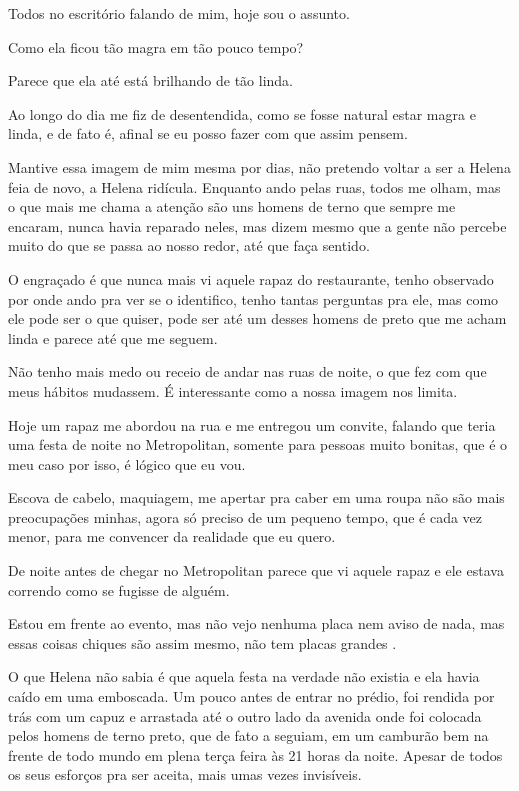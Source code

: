 Todos no escritório falando de mim, hoje sou o assunto.

Como ela ficou tão magra em tão pouco tempo?

Parece que ela até está brilhando de tão linda.

Ao longo do dia me fiz de desentendida, como se fosse natural estar magra e linda, e de fato é, afinal se eu posso fazer com que assim pensem.

Mantive essa imagem de mim mesma por dias, não pretendo voltar a ser  a Helena feia de novo, a Helena ridícula. Enquanto ando pelas ruas, todos me olham, mas o que mais me chama a atenção são uns homens de terno que sempre me encaram, nunca havia reparado neles, mas dizem mesmo que a gente não percebe muito do que se passa ao nosso redor, até que faça sentido.

O engraçado é que nunca mais vi aquele rapaz do restaurante, tenho observado por onde ando pra ver se o identifico, tenho tantas perguntas pra ele, mas como ele pode ser o que quiser, pode ser até um desses homens de preto que me acham linda e parece até que me seguem.

Não tenho mais medo ou receio de andar nas ruas de noite, o que fez com que meus hábitos mudassem. É interessante como a nossa imagem nos limita.

Hoje um rapaz me abordou na rua e me entregou um convite, falando que teria uma festa de noite no Metropolitan, somente para pessoas muito bonitas, que é o meu caso por isso, é lógico que eu vou.

Escova de cabelo, maquiagem, me apertar pra caber em uma roupa não são mais preocupações minhas, agora só preciso de um pequeno tempo, que é cada vez menor, para me convencer da realidade que eu quero.

De noite antes de chegar no Metropolitan parece que vi aquele rapaz e ele estava correndo como se fugisse de alguém.

Estou em frente ao evento, mas não vejo nenhuma placa nem aviso de nada, mas essas coisas chiques são assim mesmo, não tem placas grandes .

O que Helena não sabia é que aquela festa na verdade não existia e ela havia caído em uma emboscada. Um pouco antes de entrar no prédio, foi rendida por trás com um capuz e arrastada até o outro lado da avenida onde foi colocada pelos homens de terno preto, que de fato a seguiam, em um camburão bem na frente de todo mundo em plena terça feira às 21 horas da noite. Apesar de todos os seus esforços pra ser aceita, mais umas vezes invisíveis.

